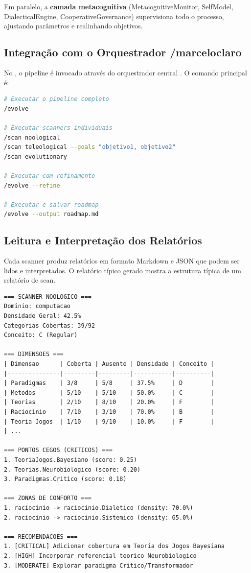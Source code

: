 Em paralelo, a \textbf{camada metacognitiva} (MetacognitiveMonitor,
SelfModel, DialecticalEngine, CooperativeGovernance) supervisiona todo
o processo, ajustando parâmetros e realinhando objetivos.

\subsection{Integração com o Orquestrador /marceloclaro}

No \opencodeeco{}, o pipeline é invocado através do orquestrador central
. O comando principal é:

\begin{lstlisting}[caption={Comandos para executar o scanner pipeline
no OpenCode CLI.},
label={cod:comandos-pipeline}, style=bashstyle, language=bash]
# Executar o pipeline completo
/evolve

# Executar scanners individuais
/scan noological
/scan teleological --goals "objetivo1, objetivo2"
/scan evolutionary

# Executar com refinamento
/evolve --refine

# Executar e salvar roadmap
/evolve --output roadmap.md
\end{lstlisting}

\subsection{Leitura e Interpretação dos Relatórios}

Cada scanner produz relatórios em formato Markdown e JSON que podem ser
lidos e interpretados. O relatório típico gerado mostra a
estrutura típica de um relatório de scan.

\begin{lstlisting}[caption={Estrutura tipica de relatorio do Noological
Scanner.},
label={cod:relatorio-tipico}, basicstyle=\ttfamily\footnotesize]
=== SCANNER NOOLOGICO ===
Dominio: computacao
Densidade Geral: 42.5%
Categorias Cobertas: 39/92
Conceito: C (Regular)

=== DIMENSOES ===
| Dimensao      | Coberta | Ausente | Densidade | Conceito |
|---------------|---------|---------|-----------|----------|
| Paradigmas    | 3/8     | 5/8     | 37.5%     | D        |
| Metodos       | 5/10    | 5/10    | 50.0%     | C        |
| Teorias       | 2/10    | 8/10    | 20.0%     | F        |
| Raciocinio    | 7/10    | 3/10    | 70.0%     | B        |
| Teoria Jogos  | 1/10    | 9/10    | 10.0%     | F        |
| ...

=== PONTOS CEGOS (CRITICOS) ===
1. TeoriaJogos.Bayesiano (score: 0.25)
2. Teorias.Neurobiologico (score: 0.20)
3. Paradigmas.Critico (score: 0.18)

=== ZONAS DE CONFORTO ===
1. raciocinio -> raciocinio.Dialetico (density: 70.0%)
2. raciocinio -> raciocinio.Sistemico (density: 65.0%)

=== RECOMENDACOES ===
1. [CRITICAL] Adicionar cobertura em Teoria dos Jogos Bayesiana
2. [HIGH] Incorporar referencial teorico Neurobiologico
3. [MODERATE] Explorar paradigma Critico/Transformador
\end{lstlisting}

